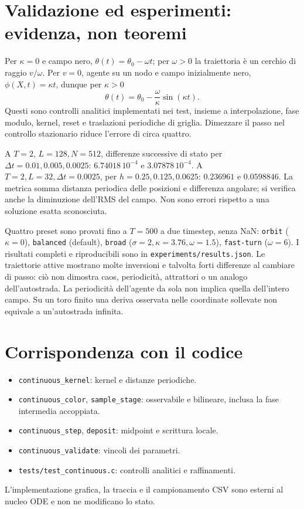 \documentclass[11pt,a4paper]{article}
\begin{document}
\section{Validazione ed esperimenti: evidenza, non teoremi}
Per $\kappa=0$ e campo nero, $\theta(t)=\theta_0-\omega t$;
per $\omega>0$ la traiettoria è un cerchio di raggio $v/\omega$.
Per $v=0$, agente su un nodo e campo inizialmente nero,
$\phi(X,t)=\kappa t$, dunque per $\kappa>0$
\begin{equation}
 \theta(t)=\theta_0-\frac{\omega}{\kappa}\sin(\kappa t).
\end{equation}
Questi sono controlli analitici implementati nei test, insieme a
interpolazione, fase modulo, kernel, reset e traslazioni periodiche di griglia.
Dimezzare il passo nel controllo stazionario riduce l'errore di circa quattro.

A $T=2$, $L=128,N=512$, differenze successive di stato per
$\Delta t=0.01,0.005,0.0025$: $6.74018\,10^{-4}$ e $3.07878\,10^{-4}$.
A $T=2,L=32,\Delta t=0.0025$, per $h=0.25,0.125,0.0625$:
$0.236961$ e $0.0598846$. La metrica somma distanza periodica delle
posizioni e differenza angolare; si verifica anche la diminuzione dell'RMS
del campo. Non sono errori rispetto a una soluzione esatta sconosciuta.

Quattro preset sono provati fino a $T=500$ a due timestep, senza NaN:
\texttt{orbit} ($\kappa=0$), \texttt{balanced} (default),
\texttt{broad} ($\sigma=2,\kappa=3.76,\omega=1.5$),
\texttt{fast-turn} ($\omega=6$). I risultati completi e riproducibili sono
in \texttt{experiments/results.json}. Le traiettorie attive mostrano
molte inversioni e talvolta forti differenze al cambiare di passo: ciò
non dimostra caos, periodicità, attrattori o un analogo dell'autostrada.
La periodicità dell'agente da sola non implica quella dell'intero campo.
Su un toro finito una deriva osservata nelle coordinate sollevate non
equivale a un'autostrada infinita.

\section{Corrispondenza con il codice}
\begin{itemize}
 \item \texttt{continuous\_kernel}: kernel e distanze periodiche.
 \item \texttt{continuous\_color}, \texttt{sample\_stage}: osservabile e bilineare,
       inclusa la fase intermedia accoppiata.
 \item \texttt{continuous\_step}, \texttt{deposit}: midpoint e scrittura locale.
 \item \texttt{continuous\_validate}: vincoli dei parametri.
 \item \texttt{tests/test\_continuous.c}: controlli analitici e raffinamenti.
\end{itemize}
L'implementazione grafica, la traccia e il campionamento CSV sono esterni
al nucleo ODE e non ne modificano lo stato.
\end{document}
